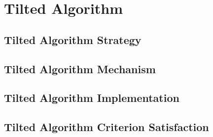 \section{Tilted Algorithm} \label{sec:tilted}

\subsection{Tilted Algorithm Strategy}

\label{sec:tilted-strategy}



\subsection{Tilted Algorithm Mechanism}
\label{sec:tilted-mechanism}











\subsection{Tilted Algorithm Implementation}
\label{sec:tilted-implementation}



\subsection{Tilted Algorithm Criterion Satisfaction}
\label{sec:tilted-satisfaction}


